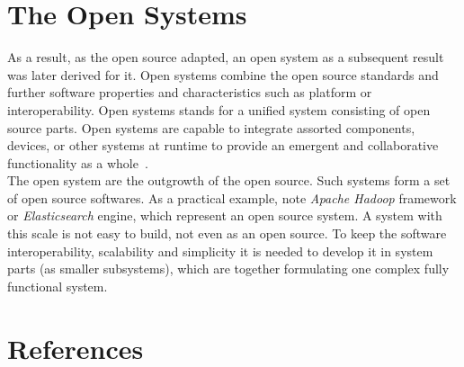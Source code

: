 \documentclass[12pt,a4paper]{article}
\theoremstyle{definition}
\begin{document}
\section{The Open Systems}

    As a result, as the open source adapted, an open system as a subsequent result was later derived for it. Open systems combine the open source standards and further software properties and characteristics such as platform or interoperability. Open systems stands for a unified system consisting of open source parts. Open systems are capable to integrate assorted components, devices, or other systems at runtime to provide an emergent and collaborative functionality as a whole~\cite{opensys1}.\\

    The open system are the outgrowth of the open source. Such systems form a set of open source softwares. As a practical example, note \textit{Apache Hadoop} framework or \textit{Elasticsearch} engine, which represent an open source system. A system with this scale is not easy to build, not even as an open source. To keep the software interoperability, scalability and simplicity it is needed to develop it in system parts (as smaller subsystems), which are together formulating one complex fully functional system.

\section{References}

\begin{flushleft}
    
\end{flushleft}
\end{document}
